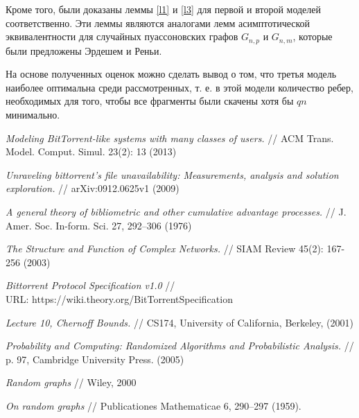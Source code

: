 \documentclass{matmex-diploma-custom}
\theoremstyle{named}
\begin{document}
Кроме того, были доказаны леммы \ref{l1} и \ref{l3} для первой и второй моделей соответственно. 
Эти леммы являются аналогами лемм асимптотической эквивалентности для случайных пуассоновских графов $G_{n, p}$ и $G_{n, m}$, 
которые были предложены Эрдешем и Реньи. 

На основе полученных оценок можно сделать вывод о том, что третья модель наиболее оптимальна среди рассмотренных,
т. е. в этой модели количество ребер, необходимых для того, чтобы все фрагменты были скачены хотя бы $qn$ минимально.





\newpage

\begin{thebibliography}{XXXX}
	{%
			\renewcommand{\baselinestretch}{1.01}
			\selectfont
			
		{\em Modeling BitTorrent-like systems with many classes of users.}
		// ACM Trans. Model. Comput. Simul. 23(2): 13 (2013)
			
		{\em Unraveling bittorrent's file unavailability: Measurements, analysis and solution exploration.}
		// arXiv:0912.0625v1 (2009)
				
		{\em A general theory of bibliometric and other cumulative advantage processes.} 
		// J. Amer. Soc. In-form. Sci. 27, 292–306 (1976)
	
		{\em The Structure and Function of Complex Networks.}
		// SIAM Review 45(2): 167-256 (2003)

		{\em Bittorrent Protocol Specification v1.0} //
		\\ URL: https://wiki.theory.org/BitTorrentSpecification
		
		{\em Lecture 10, Chernoff Bounds.}
		// CS174, University of California, Berkeley, (2001)
		
		{\em Probability and Computing: Randomized Algorithms and Probabilistic Analysis.}
		// p. 97, Cambridge University Press.  (2005)
		
		{\em Random graphs}
		// Wiley, 2000
		
		{\em On random graphs}
		// Publicationes Mathematicae 6, 290–297 (1959).
		
	}%
\end{thebibliography}
	
\end{document}
